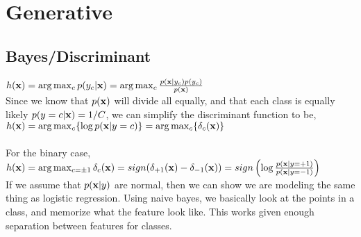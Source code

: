 \section{Generative}
\subsection{Bayes/Discriminant}
$h({\textrm{\textbf{x}}}) =\arg\max_c p(y_c|{\textrm{\textbf{x}}}) = \arg \max_c \frac{p({\textrm{\textbf{x}}}|y_c)p(y_c)}{p({\textrm{\textbf{x}}})}$\\
Since we know that $p({\textrm{\textbf{x}}})$ will divide all equally, and that each class is equally likely $p(y=c|{\textrm{\textbf{x}}}) = 1/C$, we can simplify the discriminant function to be,\\
$h({\textrm{\textbf{x}}}) = \arg \max_c \{\log p({\textrm{\textbf{x}}}|y=c)\} = \arg \max_c \{\delta_c({\textrm{\textbf{x}}})\}$\\\\
For the binary case,\\
$h({\textrm{\textbf{x}}}) = \arg\max_{c=\pm 1}\delta_c({\textrm{\textbf{x}}}) = sign(\delta_{+1}({\textrm{\textbf{x}}}) - \delta_{-1}({\textrm{\textbf{x}}})) = sign\left(\log \frac{p({\textrm{\textbf{x}}}|y=+1)}{p({\textrm{\textbf{x}}}|y=-1)}\right)$\\
If we assume that $p({\textrm{\textbf{x}}}|y)$ are normal, then we can show we are modeling the same thing as logistic regression. Using naive bayes, we basically look at the points in a class, and memorize what the feature look like. This works given enough separation between features for classes.
